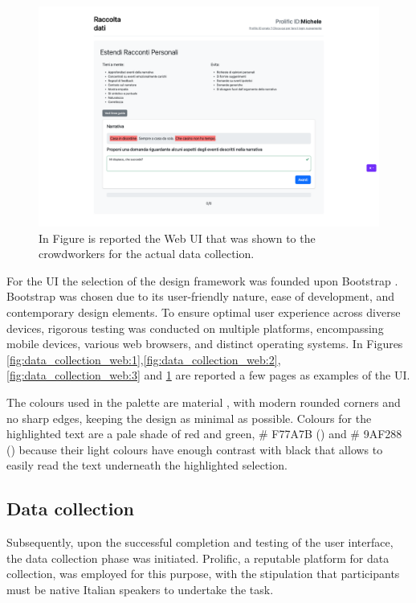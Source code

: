 \begin{figure}[!htbp]
    \centering
    \includegraphics[width=1\linewidth]{assets//imgs/UI-datacollection.png}
    \caption{In Figure is reported the Web UI that was shown to the crowdworkers for the actual data collection.}
    \label{fig:data_collection_web:4}
\end{figure}

For the UI the selection of the design framework was founded upon Bootstrap \cite{bootstrap}. Bootstrap was chosen due to its user-friendly nature, ease of development, and contemporary design elements. To ensure optimal user experience across diverse devices, rigorous testing was conducted on multiple platforms, encompassing mobile devices, various web browsers, and distinct operating systems.
In Figures \ref{fig:data_collection_web:1},\ref{fig:data_collection_web:2},\ref{fig:data_collection_web:3} and \ref{fig:data_collection_web:4} are reported a few pages as examples of the UI.

The colours used in the palette are material \cite{material}, with modern rounded corners and no sharp edges, keeping the design as minimal as possible. Colours for the highlighted text are a pale shade of red and green, \# F77A7B (\redbg{\hspace{1em}}) and \# 9AF288 (\greenbg{\hspace{1em}}) because their light colours have enough contrast with black that allows to easily read the text underneath the highlighted selection.


\subsection{Data collection}
\label{cha:methodology-data-collection}
Subsequently, upon the successful completion and testing of the user interface, the data collection phase was initiated. Prolific, a reputable platform \cite{prolific} for data collection, was employed for this purpose, with the stipulation that participants must be native Italian speakers to undertake the task.

